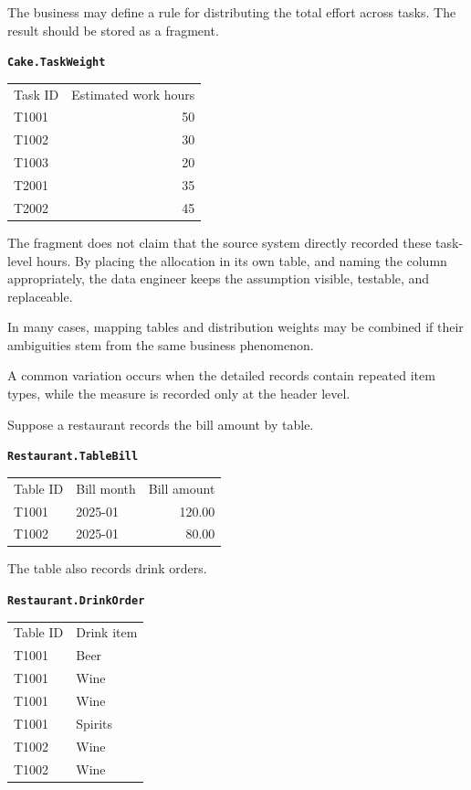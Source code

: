 \documentclass[10pt,openany,10pt]{book}
\newcounter{none}
\let\podeToprule\toprule
\let\podeMidrule\midrule
\let\podeBottomrule\bottomrule
\renewcommand{\toprule}{\arrayrulecolor{pbiGrid}\podeToprule}
\renewcommand{\midrule}{\arrayrulecolor{pbiGrid}\podeMidrule}
\renewcommand{\bottomrule}{\arrayrulecolor{pbiGrid}\podeBottomrule}
\begin{document}
The business may define a rule for distributing the total effort across
tasks. The result should be stored as a fragment.

\textbf{\texttt{Cake.TaskWeight}}

{\def\LTcaptype{none} %
\begin{longtable}[]{@{}lr@{}}
\toprule\noalign{}
Task ID & Estimated work hours \\
\midrule\noalign{}
\endhead
\bottomrule\noalign{}
\endlastfoot
T1001 & 50 \\
T1002 & 30 \\
T1003 & 20 \\
T2001 & 35 \\
T2002 & 45 \\
\end{longtable}
}

The fragment does not claim that the source system directly recorded
these task-level hours. By placing the allocation in its own table, and
naming the column appropriately, the data engineer keeps the assumption
visible, testable, and replaceable.

In many cases, mapping tables and distribution weights may be combined
if their ambiguities stem from the same business phenomenon.

A common variation occurs when the detailed records contain repeated
item types, while the measure is recorded only at the header level.

Suppose a restaurant records the bill amount by table.

\textbf{\texttt{Restaurant.TableBill}}

{\def\LTcaptype{none} %
\begin{longtable}[]{@{}llr@{}}
\toprule\noalign{}
Table ID & Bill month & Bill amount \\
\midrule\noalign{}
\endhead
\bottomrule\noalign{}
\endlastfoot
T1001 & 2025-01 & 120.00 \\
T1002 & 2025-01 & 80.00 \\
\end{longtable}
}

The table also records drink orders.

\textbf{\texttt{Restaurant.DrinkOrder}}

{\def\LTcaptype{none} %
\begin{longtable}[]{@{}ll@{}}
\toprule\noalign{}
Table ID & Drink item \\
\midrule\noalign{}
\endhead
\bottomrule\noalign{}
\endlastfoot
T1001 & Beer \\
T1001 & Wine \\
T1001 & Wine \\
T1001 & Spirits \\
T1002 & Wine \\
T1002 & Wine \\
\end{longtable}
}
\end{document}
